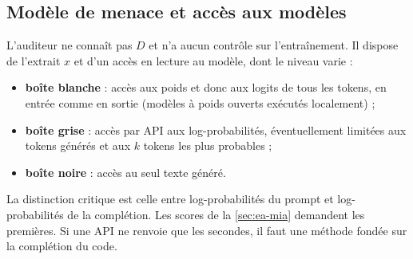 	\subsection{Modèle de menace et accès aux modèles}\label{sec:cadre-acces}
		L'auditeur ne connaît pas $D$ et n'a aucun contrôle sur l'entraînement. Il dispose de l'extrait $x$ et d'un accès en lecture au modèle, dont le niveau varie :
		\begin{itemize}
			\item \textbf{boîte blanche} : accès aux poids et donc aux logits de tous les tokens, en entrée comme en sortie (modèles à poids ouverts exécutés localement) ;
			\item \textbf{boîte grise} : accès par API aux log-probabilités, éventuellement limitées aux tokens générés et aux $k$ tokens les plus probables ;
			\item \textbf{boîte noire} : accès au seul texte généré.
		\end{itemize}

		La distinction critique est celle entre log-probabilités du prompt et log-probabilités de la complétion. Les scores de la \cref{sec:ea-mia} demandent les premières. Si une API ne renvoie que les secondes, il faut une méthode fondée sur la complétion du code.

